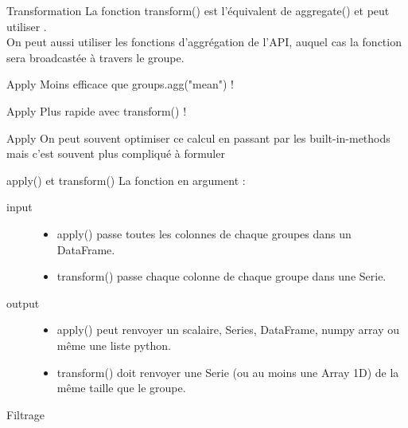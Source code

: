 \begin{frame}{Transformation}
  La fonction transform() est l'équivalent de aggregate() et peut utiliser   . \\
  On peut aussi utiliser les fonctions d'aggrégation de l'API, auquel cas la fonction sera broadcastée à travers le groupe.
\end{frame}

\begin{frame}{Apply}
  Moins efficace que groups.agg("mean") !
\end{frame}

\begin{frame}{Apply}
  Plus rapide avec transform() !
\end{frame}

\begin{frame}{Apply}
  On peut souvent optimiser ce calcul en passant par les built-in-methods mais c'est souvent plus compliqué à formuler \\
\end{frame}

\begin{frame}{apply() et transform()}
  La fonction en argument :
  \begin{description}
    \item[input]  \begin{itemize}
                    \item apply() passe toutes les colonnes de chaque groupes dans un DataFrame.
                    \item transform() passe chaque colonne de chaque groupe dans une Serie.
                  \end{itemize}
    \item[output]  \begin{itemize}
                    \item apply() peut renvoyer un scalaire, Series, DataFrame, numpy array ou même une liste python.
                    \item transform() doit renvoyer une Serie (ou au moins une Array 1D) de la même taille que le groupe.
                  \end{itemize}
  \end{description}
\end{frame}

\begin{frame}{Filtrage}
\end{frame}
